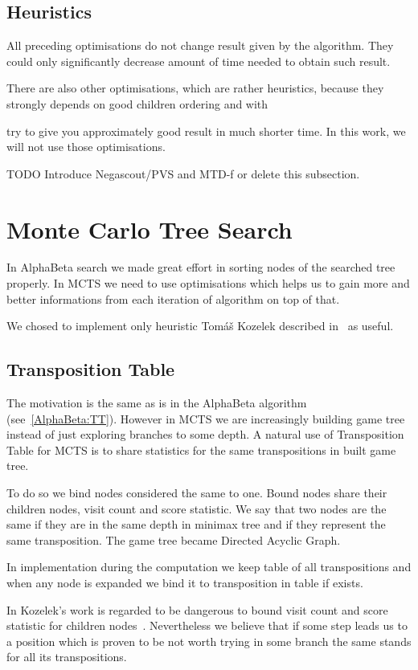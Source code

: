 \subsection{Heuristics}
All preceding optimisations do not change result given by the algorithm. They
could only significantly decrease amount of time needed to obtain such result.

There are also other optimisations, which are rather heuristics, because they strongly depends on good children ordering and with 

try to
give you approximately good result in much shorter time. In this work, we
will not use those optimisations.

TODO Introduce  Negascout/PVS and MTD-f or delete this subsection.


\section{Monte Carlo Tree Search}
In AlphaBeta search we made great effort in sorting nodes of the searched tree
properly. In MCTS we need to use optimisations which helps us to gain more and
better informations from each iteration of algorithm on top of that.

We chosed to implement only heuristic Tomáš Kozelek described in~\cite{KOZELEK}
as useful.

\subsection{Transposition Table}
The motivation is the same as is in the AlphaBeta algorithm
(see~\ref{AlphaBeta:TT}). However in MCTS we are increasingly building game
tree instead of just exploring branches to some depth. A natural use of
Transposition Table for MCTS is to share statistics for the same transpositions
in built game tree.

To do so we bind nodes considered the same to one. Bound nodes share their
children nodes, visit count and score statistic. We say that two nodes are the
same if they are in the same depth in minimax tree and if they represent the
same transposition. The game tree became Directed Acyclic Graph.

In implementation during the computation we keep table of all transpositions
and when any node is expanded we bind it to transposition in table if exists.

In Kozelek's work is regarded to be dangerous to bound visit count and score
statistic for children nodes~\cite{KOZELEK}. Nevertheless we believe that if
some step leads us to a position which is proven to be not worth trying in some
branch the same stands for all its transpositions.

